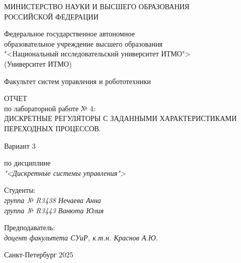 \thispagestyle{empty}

\begin{center}
    МИНИСТЕРСТВО НАУКИ И ВЫСШЕГО ОБРАЗОВАНИЯ \\ РОССИЙСКОЙ ФЕДЕРАЦИИ

    \vspace{20pt}

    Федеральное государственное автономное \\ образовательное учреждение высшего образования \\
    "<Национальный исследовательский университет ИТМО"> \\
    (Университет ИТМО)

    \vspace{20pt}

    Факультет систем управления и робототехники 
\end{center}

\vfill

\begin{center}
	ОТЧЕТ \\  
	по лабораторной работе № 4: \\
	\uppercase{Дискретные регуляторы с заданными характеристиками переходных процессов.}
	\vspace{20pt}
	
	Вариант 3 \\
	
	\vspace{20pt}
	
	по дисциплине \\
	\textit{"<Дискретные системы управления">}
	
\end{center}

\vfill

\noindent Студенты: \\
\textit{группа № R3438 \hfill Нечаева Анна}\\
\textit{группа № R3443 \hfill Ванюта Юлия}

\vspace{20pt}

\noindent Предподаватель: \\
\textit{доцент факультета СУиР, к.т.н. \hfill Краснов А.Ю.}

\vfill

\begin{center}
    Санкт-Петербург 2025
\end{center}